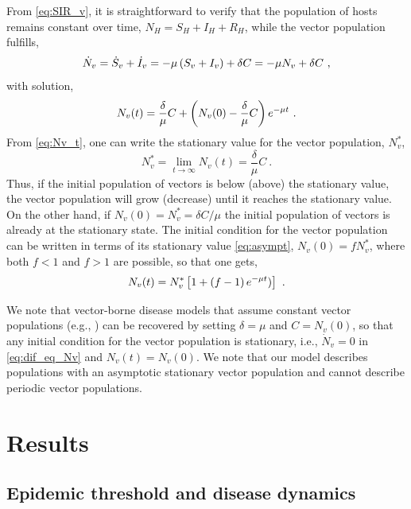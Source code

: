 From \cref{eq:SIR_v}, it is straightforward to verify that the population of
hosts remains constant over time, $N_H=S_H+I_H+R_H$, while the vector
population fulfills,
\begin{equation}\label{eq:dif_eq_Nv}
    \dot{N}_v=\dot{S}_v+\dot{I}_v=-\mu\left(S_v+I_v\right)+\delta C=-\mu N_v
    + \delta C \ ,
\end{equation}
with solution,
\begin{equation}\label{eq:Nv_t}
    N_v(t)=\frac{\delta}{\mu}C +
    \left(N_v(0)-\frac{\delta}{\mu}C\right)e^{-\mu t} \ .
\end{equation}
From \cref{eq:Nv_t}, one can write the stationary value for the vector
population, $N_v^*$,
\begin{equation}
    N_v^*=\lim_{t\to\infty}N_v(t)=\frac{\delta}{\mu}C \ .
    \label{eq:asympt}
\end{equation}
Thus, if the initial population of vectors is below (above) the stationary
value, the vector population will grow (decrease) until it reaches the
stationary value. On the other hand, if $N_v(0)=N_v^*=\delta C/\mu$ the initial
population of vectors is already at the stationary state. The initial condition
for the vector population can be written in terms of its stationary value
\cref{eq:asympt}, $N_v(0)=fN_v^*$, where both $f<1$ and $f>1$ are possible, so
that one gets,
\begin{equation}\label{eq:Nv_t_fraction}
    N_v(t)=N_v^*\claudator{1+\parentesi{f-1}e^{-\mu t})} \ .
\end{equation}

We note that vector-borne disease models that assume constant vector
populations (e.g., \cite{Brauer2016}) can be recovered by setting $\delta=\mu$
and $C=N_v(0)$, so that any initial condition for the vector population is
stationary, i.e., $\dot{N}_v=0$ in \cref{eq:dif_eq_Nv} and $N_v(t)=N_v(0)$. We
note that our model describes populations with an asymptotic stationary vector
population and cannot describe periodic vector populations.

\section{Results} \label{sec:results}

\subsection{Epidemic threshold and disease dynamics}
\label{sec:R0statvp}


